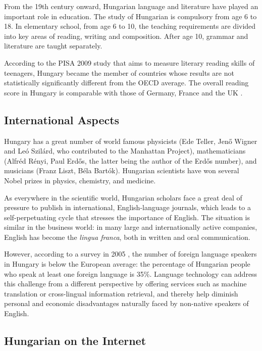 \begin{multicols}{2}
From the 19th century onward, Hungarian language and literature have played an important role in education. The study of Hungarian is compulsory from age 6 to 18. In elementary school, from age 6 to 10, the teaching requirements are divided into key areas of reading, writing and composition. After age 10, grammar and literature are taught separately.

According to the PISA 2009 study  that aims to measure literary reading skills of teenagers, Hungary became the member of countries whose results are not statistically significantly different from the OECD average. The overall reading score in Hungary is comparable with those of Germany, France and the UK \cite{pisa}. 

\subsection{International Aspects}

Hungary has a great number of world famous physicists (Ede Teller, Jenő Wigner and Leó Szilárd, who contributed to the Manhattan Project), mathematicians (Alfréd Rényi, Paul Erdős, the latter being the author of the Erdős number), and musicians (Franz Liszt, Béla Bartók). Hungarian scientists have won several Nobel prizes in physics, chemistry, and medicine.

As everywhere in the scientific world, Hungarian scholars face a great deal of pressure to publish in international, English-language journals, which leads to a self-perpetuating cycle that stresses the importance of English. The situation is similar in the business world: in many large and internationally active companies, English has become the \textit{lingua franca}, both in written and oral communication.

However, according to a survey in 2005 \cite{tarki}, the number of foreign language speakers in Hungary is below the European average: the percentage of Hungarian people who speak at least one foreign language is 35\%. Language technology can address this challenge from a different perspective by offering services such as machine translation or cross-lingual information retrieval, and thereby help diminish personal and economic disadvantages naturally faced by non-native speakers of English. 

\subsection{Hungarian on the Internet}


\end{multicols}
